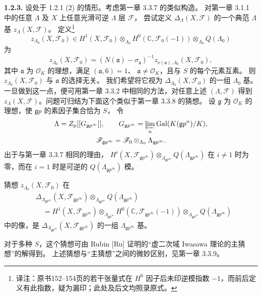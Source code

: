 \noindent\textbf{1.2.3.} 设处于 1.2.1 (2) 的情形。考虑第一章 3.3.7 的类似构造。
对第一章 3.1.1 中的任意 $\Lambda$ 及 $X$ 上任意光滑可逆 $\Lambda$ 层 $\mathscr F$，
尝试定义 $\Delta_\Lambda(X,\mathscr F)$ 的一个典范 $\Lambda$ 基 $z_\Lambda(X,\mathscr F)$。
定义\footnote{译注：原书152--154页的若干张量式在 $H^0$ 因子后未印逆模指数 $-1$，而前后定义有此指数，疑为漏印；此处及后文均照录原式。}
\[
z_{\Lambda_0}(X,\mathscr F_0)\in H^1(X,\mathscr F_0)\otimes_{\Lambda_0}
H^0(\mathbb C,\mathscr F_0(-1))\otimes_{\Lambda_0}Q(\Lambda_0)
\]
为
\[
z_{\Lambda_0}(X,\mathscr F_0)
=(N(\mathfrak a)-\sigma_{\mathfrak a})^{-1}
z_{\nu(\mathfrak a),\Lambda_0}(X,\mathscr F_0),
\]
其中 $\mathfrak a$ 为 $\mathcal O_K$ 的理想，满足 $(\mathfrak a,6)=1$、
$\mathfrak a\ne\mathcal O_K$，且与 $S$ 的每个元素互素。
则 $z_{\Lambda_0}(X,\mathscr F_0)$ 与 $\mathfrak a$ 的选择无关。
我们希望将它视为 $\Delta_{\Lambda_0}(X,\mathscr F_0)$ 的一组 $\Lambda_0$ 基。
一旦做到这一点，便可用第一章 3.3.2 中相同的方法，对任意上述 $(\Lambda,\mathscr F)$
得到 $z_\Lambda(X,\mathscr F)$。问题可归结为下面这个类似于第一章 3.3.8 的猜想。
设 $\mathfrak g$ 为 $\mathcal O_K$ 的理想，使 $\mathfrak gp$ 的素因子集合恰为 $S$，
令
\[
\begin{gathered}
\Lambda=Z_p[[G_{\mathfrak gp^\infty}]],\qquad
G_{\mathfrak gp^\infty}=\varprojlim_n\operatorname{Gal}(K(\mathfrak gp^n)/K),\\
\mathscr F_{\mathfrak gp^\infty}=\mathscr F_0\otimes_{\Lambda_0}\Lambda_{\mathfrak gp^\infty}.
\end{gathered}
\]
出于与第一章 3.3.7 相同的理由，
$H^i(X,\mathscr F_{\mathfrak gp^\infty})\otimes_{\Lambda_{\mathfrak gp^\infty}}
Q(\Lambda_{\mathfrak gp^\infty})$ 在 $i\ne1$ 时为零，而在 $i=1$ 时是可逆的
$Q(\Lambda_{\mathfrak gp^\infty})$ 模。
\begin{statement}{猜想}
$z_{\Lambda_0}(X,\mathscr F_0)$ 在
\begin{align*}
&\Delta_{\Lambda_{\mathfrak gp^\infty}}(X,\mathscr F_{\mathfrak gp^\infty})
\otimes_{\Lambda_{\mathfrak gp^\infty}}Q(\Lambda_{\mathfrak gp^\infty})\\
&\quad=H^1(X,\mathscr F_{\mathfrak gp^\infty})\otimes_{\Lambda_{\mathfrak gp^\infty}}
H^0(\mathbb C,\mathscr F_{\mathfrak gp^\infty}(-1))
\otimes_{\Lambda_{\mathfrak gp^\infty}}Q(\Lambda_{\mathfrak gp^\infty})
\end{align*}
中的像，是 $\Delta_{\Lambda_{\mathfrak gp^\infty}}(X,\mathscr F_{\mathfrak gp^\infty})$
的一组 $\Lambda_{\mathfrak gp^\infty}$ 基。
\end{statement}
对于多种 $S$，这个猜想可由 Rubin [Ru] 证明的“虚二次域 Iwasawa 理论的主猜想”的解得到。
上述猜想与“主猜想”之间的微妙区别，见第一章 3.3.9。


